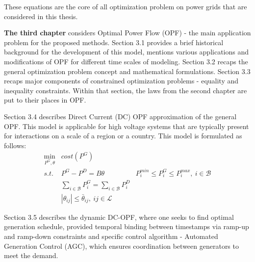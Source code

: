 These equations are the core of all optimization problem on power grids that are considered in this thesis.



\textbf{The third chapter} considers Optimal Power Flow (OPF) - the main application problem for the proposed methods. Section 3.1 provides a brief historical background for the development of this model, mentions various applications and modifications of OPF for different time scales of modeling. 
Section 3.2 recaps the general optimization problem concept and mathematical formulations.
Section 3.3 recaps major components of constrained optimization problems - equality and inequality constraints. Within that section, the laws from the second chapter are put to their places in OPF.

Section 3.4 describes Direct Current (DC) OPF approximation of the general OPF. This model is applicable for high voltage systems that are typically present for interactions on a scale of a region or a country. This model is formulated as follows:
\begin{equation}
    \begin{aligned}
        \min_{P^G, \theta}  & \textit{cost}(P^G) \\
        \textit{s.t. }      & P^G - P^D = B\theta
                            & P_i^{min} \leq P_i^G \leq P_i^{max}, ~ i \in \mathcal{B} \\ 
                            & \sum_{i \in \mathcal{B}} P^G_i = \sum_{i \in \mathcal{B}} P^D_i \\
                            & |\theta_{ij}| \leq \bar{\theta}_{ij}, ~ ij \in \mathcal{L}
    \end{aligned}
    \label{eq:dc-opf}
\end{equation}

Section 3.5 describes the dynamic DC-OPF, where one seeks to find optimal generation schedule, provided temporal binding between timestamps via ramp-up and ramp-down constraints and specific control algorithm - Automated Generation Control (AGC), which ensures coordination between generators to meet the demand. 

